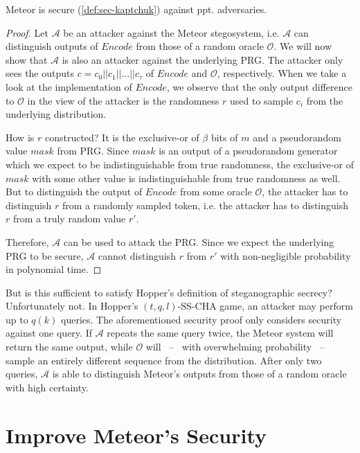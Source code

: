 \begin{theorem}
	Meteor is secure (\autoref{def:sec-kaptchuk}) against ppt. adversaries. 
\label{thm:meteor-secure}
\end{theorem}
\begin{proof}
	Let $\mathcal{A}$ be an attacker against the Meteor stegosystem, i.e. $\mathcal{A}$ can distinguish outputs of $Encode$ from those of a random oracle $\mathcal{O}$. 
	We will now show that $\mathcal{A}$ is also an attacker against the underlying PRG.
	The attacker only sees the outputs $c = c_0 ||c_1 || \dots || c_{\tau}$ of $Encode$ and $\mathcal{O}$, respectively.
	When we take a look at the implementation of $Encode$, we observe that the only output difference to $\mathcal{O}$ in the view of the attacker is the randomness $r$ used to sample $c_i$ from the underlying distribution.
	
	How is $r$ constructed? 
	It is the exclusive-or of $\beta$ bits of $m$ and a pseudorandom value $mask$ from PRG.
	Since $mask$ is an output of a pseudorandom generator which we expect to be indistinguishable from true randomness, the exclusive-or of $mask$ with some other value is indistinguishable from true randomness as well.
	But to distinguish the output of $Encode$ from some oracle $\mathcal{O}$, the attacker has to distinguish $r$ from a randomly sampled token, i.e. the attacker has to distinguish $r$ from a truly random value $r'$.
	
	Therefore, $\mathcal{A}$ can be used to attack the PRG.
	Since we expect the underlying PRG to be secure, $\mathcal{A}$ cannot distinguish $r$ from $r'$ with non-negligible probability in polynomial time.
\end{proof}

But is this sufficient to satisfy Hopper's definition of steganographic secrecy?
Unfortunately not.
In Hopper's $(t,q,l)$-SS-CHA game, an attacker may perform up to $q(k)$ queries.
The aforementioned security proof only considers security against one query.
If $\mathcal{A}$ repeats the same query twice, the Meteor system will return the same output, while $\mathcal{O}$ will~ --~ with overwhelming probability~ --~ sample an entirely different sequence from the distribution.
After only two queries, $\mathcal{A}$ is able to distinguish Meteor's outputs from those of a random oracle with high certainty.


\section{Improve Meteor's Security}

